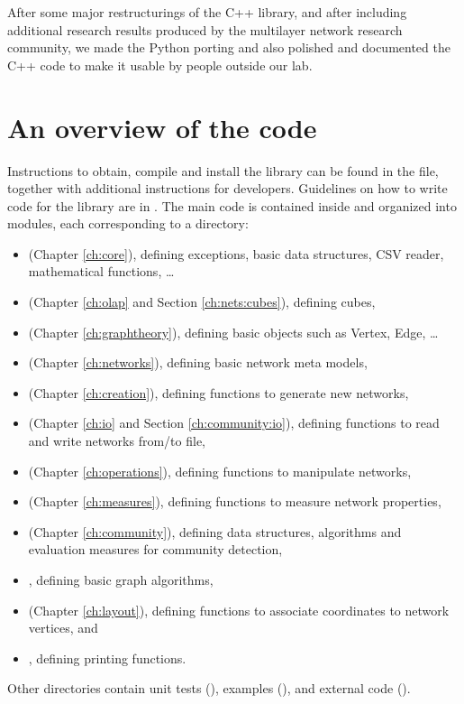 After some major restructurings of the C++ library, and after including additional research results produced by the multilayer network research community, we made the Python porting and also polished and documented the C++ code to make it usable by people outside our lab.

\section{An overview of the code}

Instructions to obtain, compile and install the library can be found in the  file, together with additional instructions for developers. Guidelines on how to write code for the library are in . The main code is contained inside  and organized into modules, each corresponding to a directory: 
\begin{itemize}
\item {} (Chapter \ref{ch:core}), defining exceptions, basic data structures, CSV reader, mathematical functions, \dots
\item {} (Chapter \ref{ch:olap} and Section \ref{ch:nets:cubes}), defining cubes,
\item {} (Chapter \ref{ch:graphtheory}), defining basic objects such as Vertex, Edge, \dots
\item {} (Chapter \ref{ch:networks}), defining basic network meta models,
\item {} (Chapter \ref{ch:creation}), defining functions to generate new networks,
\item {} (Chapter \ref{ch:io} and Section \ref{ch:community:io}), defining functions to read and write networks from/to file,
\item {} (Chapter \ref{ch:operations}), defining functions to manipulate networks,
\item {} (Chapter \ref{ch:measures}), defining functions to measure network properties,
\item {} (Chapter \ref{ch:community}), defining data structures, algorithms and evaluation measures for community detection,
\item {}, defining basic graph algorithms,
\item {} (Chapter \ref{ch:layout}), defining functions to associate coordinates to network vertices, and
\item {}, defining printing functions.
\end{itemize}
Other directories contain unit tests (), examples (), and external code ().

